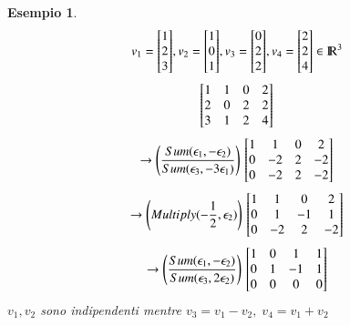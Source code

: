 \documentclass[12pt,a4paper]{article}
\theoremstyle{break}
\newtheorem{example}{Esempio}[subsection]
\newcommand\R{{\rm I\!R}}
\newenvironment{vect}
    {
        \left[
            \begin{matrix}
                
    }
    { 
            \end{matrix}
        \right]
    }
\begin{document}
    \begin{example}
        \[
            v_1 = \begin{vect} 1 \\ 2 \\ 3\end{vect}, 
            v_2 = \begin{vect} 1 \\ 0 \\ 1\end{vect}, 
            v_3 = \begin{vect} 0 \\ 2 \\ 2\end{vect},
            v_4 = \begin{vect} 2 \\ 2 \\ 4\end{vect}
            \in\R^3
        \]
        \[
            \begin{vect}
                1 & 1 & 0 & 2 \\
                2 & 0 & 2 & 2 \\
                3 & 1 & 2 & 4 \\
            \end{vect}
        \]
        \[
            \rightarrow \left(\frac{Sum(\epsilon_1, -\epsilon_2)}{Sum(\epsilon_3, -3\epsilon_1)}\right)\,
            \begin{vect}
                1 & 1 & 0 & 2 \\
                0 & -2 & 2 & -2 \\
                0 & -2 & 2 & -2 \\
            \end{vect}
        \]
        \[
            \rightarrow \left(Multiply(-\frac{1}{2}, \epsilon_2)\right)\,
            \begin{vect}
                1 & 1 & 0 & 2 \\
                0 & 1 & -1 & 1 \\
                0 & -2 & 2 & -2 \\
            \end{vect}
        \]
        \[
            \rightarrow \left(\frac{Sum(\epsilon_1, -\epsilon_2)}{Sum(\epsilon_3, 2\epsilon_2)}\right)\,
            \begin{vect}
                1 & 0 & 1 & 1 \\
                0 & 1 & -1 & 1 \\
                0 & 0 & 0 & 0 \\
            \end{vect}
        \]
        $v_1,v_2$ sono indipendenti mentre $v_3 = v_1-v_2,\; v_4 =v_1+v_2$
    \end{example}
\end{document}
